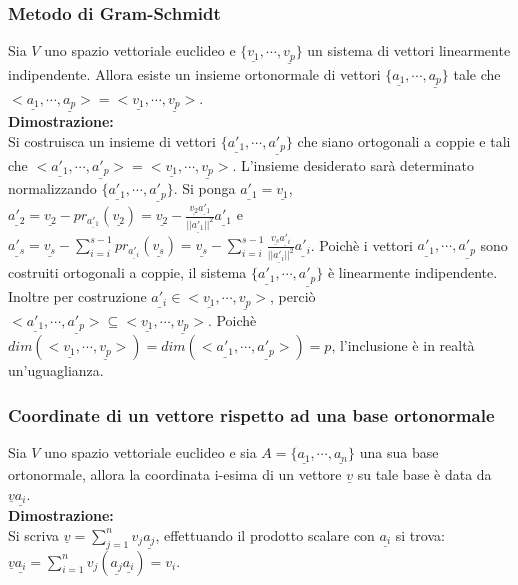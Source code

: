 \subsubsection{Metodo di Gram-Schmidt}
Sia $V$ uno spazio vettoriale euclideo e $\{\underline{v_1},\cdots,\underline{v_p}\}$ un sistema di vettori linearmente indipendente. Allora esiste un insieme ortonormale di 
vettori $\{\underline{a_1},\cdots,\underline{a_p}\}$ tale che $<\underline{a_1},\cdots,\underline{a_p}>=<\underline{v_1},\cdots,\underline{v_p}>$.\\
\textbf{Dimostrazione:}\\
Si costruisca un insieme di vettori $\{\underline{a'_1},\cdots,\underline{a'_p}\}$ che siano ortogonali a coppie e tali che $<\underline{a'_1},\cdots,\underline{a'_p}>=<
\underline{v_1},\cdots,\underline{v_p}>$. L'insieme desiderato sar\`a determinato normalizzando $\{\underline{a'_1},\cdots,\underline{a'_p}\}$. Si ponga $\underline{a'_1}=
\underline{v_1}$,\\ $\underline{a'_2}=\underline{v_2}-pr_{\underline{a'_1}}(\underline{v_2})=\underline{v_2}-\frac{\underline{v_2}\underline{a'_1}}{||\underline{a'_1}||^2}
\underline{a'_1}$ e $\underline{a'_s}=\underline{v_s}-\sum\limits_{i=i}^{s-1}pr_{\underline{a'_i}}(\underline{v_s})=\underline{v_s}-\sum\limits_{i=i}^{s-1}\frac{\underline{v_s}
\underline{a'_i}}{||\underline{a'_i}||^2}\underline{a'_i}$. Poich\`e i vettori $\underline{a'_1},\cdots,\underline{a'_p}$ sono costruiti ortogonali a coppie, il sistema 
$\{\underline{a'_1},\cdots,\underline{a'_p}\}$ \`e linearmente indipendente. Inoltre per costruzione $\underline{a'_i}\in <\underline{v_1},\cdots,\underline{v_p}>$, perci\`o 
$<\underline{a'_1},\cdots,\underline{a'_p}>\subseteq<\underline{v_1},\cdots,\underline{v_p}>$. Poich\`e $dim(<\underline{v_1},\cdots,\underline{v_p}>)=dim(<\underline{a'_1},
\cdots,\underline{a'_p}>)=p$, l'inclusione \`e in realt\`a un'uguaglianza.
\subsubsection{Coordinate di un vettore rispetto ad una base ortonormale}
Sia $V$ uno spazio vettoriale euclideo e sia $A=\{\underline{a_1},\cdots,\underline{a_n}\}$ una sua base ortonormale, allora la coordinata i-esima di un vettore $\underline{v}$ 
su tale base \`e data da $\underline{v}\underline{a_i}$.\\
\textbf{Dimostrazione:}\\
Si scriva $\underline{v}=\sum\limits_{j=1}^nv_j\underline{a_j}$, effettuando il prodotto scalare con $\underline{a_i}$ si trova: $\underline{v}\underline{a_i}=
\sum\limits_{i=1}^nv_j(\underline{a_j}\underline{a_i})=v_i$.
